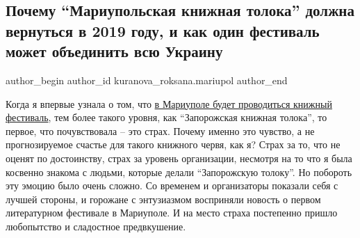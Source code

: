  
 
 
 
 
 
\subsection{Почему \enquote{Мариупольская книжная толока} должна вернуться в 2019 году, и как один фестиваль может объединить всю Украину}
\label{sec:18_04_2018.stz.news.ua.mrpl_city.1.knizhna_toloka_vernutsja_2019}
 
\ifcmt
 author_begin
   author_id kuranova_roksana.mariupol
 author_end
\fi

Когда я впервые узнала о том, что
\href{https://mrpl.city/news/view/knizhnaya-toloka-vpervye-priedet-v-mariupol}{в %
Мариуполе будет проводиться книжный фестиваль}, тем более такого уровня, как
\enquote{Запорожская книжная толока}, то первое, что почувствовала – это страх. Почему
именно это чувство, а не прогнозируемое счастье для такого книжного червя, как
я? Страх за то, что не оценят по достоинству, страх за уровень организации,
несмотря на то что я была косвенно знакома с людьми, которые делали
\enquote{Запорожскую толоку}. Но побороть эту эмоцию было очень сложно. Со временем и
организаторы показали себя с лучшей стороны, и горожане с энтузиазмом
восприняли новость о первом литературном фестивале в Мариуполе. И на место
страха постепенно пришло любопытство и сладостное предвкушение.


